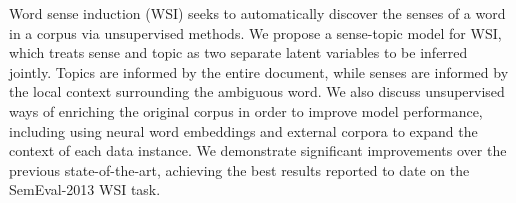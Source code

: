 Word sense induction (WSI) seeks to automatically discover the senses of a word in a corpus via unsupervised methods. We propose a sense-topic model for WSI, which treats sense and topic as two separate latent variables to be inferred jointly. Topics are informed by the entire document, while senses are informed by the local context surrounding the ambiguous word. We also discuss unsupervised ways of enriching the original corpus in order to improve model performance, including using neural word embeddings and external corpora to expand the context of each data instance. We demonstrate significant improvements over the previous state-of-the-art, achieving the best results reported to date on the SemEval-2013 WSI task.